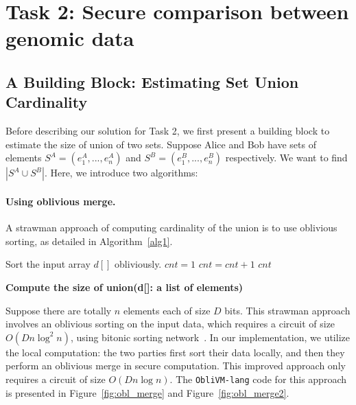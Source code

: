 \section{Task 2: Secure comparison between genomic data}
\subsection{A Building Block: Estimating Set Union Cardinality}
Before describing our solution for Task 2, we first present a building block to estimate the size of union of two sets.
Suppose Alice and Bob have sets of elements $S^A = (e^A_1,...,e^A_n)$
and $S^B = (e^B_1,...,e^B_n)$ respectively. We want to find $|S^A\cup S^B|$. Here, we introduce two algorithms:

\paragraph{Using oblivious merge.}
A strawman approach of computing cardinality of the union is to use oblivious sorting, as detailed in Algorithm~\ref{alg1}.

\begin{algorithm}[t]
\begin{algorithmic}[1]
\State Sort the input array $d[]$ obliviously.
\State $cnt = 1$
		\State $cnt = cnt + 1$
	\EndIf
\EndFor
\State\Return $cnt$
\end{algorithmic}
\caption{\textbf{Compute the size of union(d[]: a list of elements)}} %
\label{alg1}
\end{algorithm}
Suppose there are totally $n$ elements each of size $D$ bits.
This strawman approach involves an oblivious sorting on the input data, which requires a circuit of size $O(Dn\log^2n)$, 
using bitonic sorting network~\cite{bitonicsort}. In our implementation,  we utilize the local computation:
the two parties first sort their data locally, and then they perform an oblivious merge in secure computation. This improved approach
only requires a circuit of size $O(Dn\log n)$. The {\tt ObliVM-lang} code for this approach is presented in Figure~\ref{fig:obl_merge} and Figure~\ref{fig:obl_merge2}.

